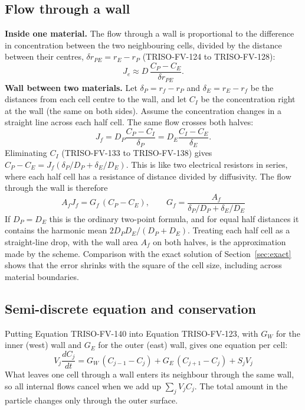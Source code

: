 \documentclass[11pt]{article}
\begin{document}
\subsection{Flow through a wall}
\textbf{Inside one material.} The flow through a wall is proportional to the difference in concentration between the two neighbouring cells, divided by the distance between their centres, $\delta r_{PE}=r_E-r_P$ (TRISO-FV-124 to TRISO-FV-128):
\[
J_e\approx D\,\frac{C_P-C_E}{\delta r_{PE}} .
\]
\textbf{Wall between two materials.} Let $\delta_P=r_f-r_P$ and $\delta_E=r_E-r_f$ be the distances from each cell centre to the wall, and let $C_I$ be the concentration right at the wall (the same on both sides). Assume the concentration changes in a straight line across each half cell. The same flow crosses both halves:
\[
J_f=D_P\frac{C_P-C_I}{\delta_P}=D_E\frac{C_I-C_E}{\delta_E}.
\]
Eliminating $C_I$ (TRISO-FV-133 to TRISO-FV-138) gives $C_P-C_E=J_f\left(\delta_P/D_P+\delta_E/D_E\right)$. This is like two electrical resistors in series, where each half cell has a resistance of distance divided by diffusivity. The flow through the wall is therefore
\begin{equation}
\boxed{A_fJ_f=G_f\,(C_P-C_E),\qquad G_f=\frac{A_f}{\delta_P/D_P+\delta_E/D_E}}
\tag{TRISO-FV-140}
\end{equation}
If $D_P=D_E$ this is the ordinary two-point formula, and for equal half distances it contains the harmonic mean $2D_PD_E/(D_P+D_E)$. Treating each half cell as a straight-line drop, with the wall area $A_f$ on both halves, is the approximation made by the scheme. Comparison with the exact solution of Section~\ref{sec:exact} shows that the error shrinks with the square of the cell size, including across material boundaries.

\subsection{Semi-discrete equation and conservation}
Putting Equation TRISO-FV-140 into Equation TRISO-FV-123, with $G_W$ for the inner (west) wall and $G_E$ for the outer (east) wall, gives one equation per cell:
\begin{equation}
\boxed{V_j\frac{dC_j}{dt}=G_W\,(C_{j-1}-C_j)+G_E\,(C_{j+1}-C_j)+S_jV_j}
\tag{TRISO-FV-155}
\end{equation}
What leaves one cell through a wall enters its neighbour through the same wall, so all internal flows cancel when we add up $\sum_jV_jC_j$. The total amount in the particle changes only through the outer surface.
\end{document}
